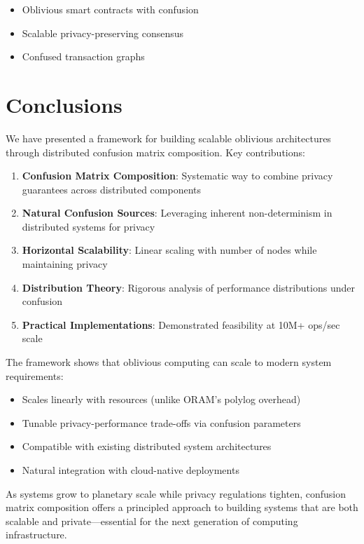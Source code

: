\documentclass[11pt,final]{article}
\begin{document}
\begin{itemize}
    \item Oblivious smart contracts with confusion
    \item Scalable privacy-preserving consensus
    \item Confused transaction graphs
\end{itemize}

\section{Conclusions}

We have presented a framework for building scalable oblivious architectures through distributed confusion matrix composition. Key contributions:

\begin{enumerate}
    \item \textbf{Confusion Matrix Composition}: Systematic way to combine privacy guarantees across distributed components
    
    \item \textbf{Natural Confusion Sources}: Leveraging inherent non-determinism in distributed systems for privacy
    
    \item \textbf{Horizontal Scalability}: Linear scaling with number of nodes while maintaining privacy
    
    \item \textbf{Distribution Theory}: Rigorous analysis of performance distributions under confusion
    
    \item \textbf{Practical Implementations}: Demonstrated feasibility at 10M+ ops/sec scale
\end{enumerate}

The framework shows that oblivious computing can scale to modern system requirements:
\begin{itemize}
    \item Scales linearly with resources (unlike ORAM's polylog overhead)
    \item Tunable privacy-performance trade-offs via confusion parameters
    \item Compatible with existing distributed system architectures
    \item Natural integration with cloud-native deployments
\end{itemize}

As systems grow to planetary scale while privacy regulations tighten, confusion matrix composition offers a principled approach to building systems that are both scalable and private—essential for the next generation of computing infrastructure.


\end{document}
